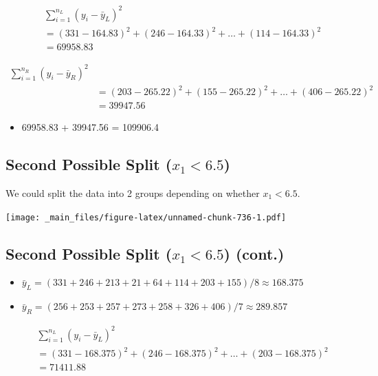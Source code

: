 \documentclass[]{book}
\providecommand{\tightlist}{%
  \setlength{\itemsep}{0pt}\setlength{\parskip}{0pt}}
\begin{document}
\[
\begin{aligned}
& \displaystyle\sum_{i=1}^{n_L} (y_i -\bar{y}_L)^2  \\
& =(331-164.83)^2+(246-164.33)^2 + \ldots+(114-164.33)^2 \\
& =69958.83
\end{aligned}
\]

\[
\begin{aligned}
\displaystyle\sum_{i=1}^{n_R} (y_i -\bar{y}_R)^2 \\
& =(203-265.22)^2+(155-265.22)^2 + \ldots+(406-265.22)^2 \\
& =39947.56
\end{aligned}
\]

\begin{itemize}
\tightlist
\item
  69958.83 + 39947.56 = 109906.4
\end{itemize}

\subsection{\texorpdfstring{Second Possible Split
(\(x_1 < 6.5\))}{Second Possible Split (x\_1 \textless{} 6.5)}}\label{second-possible-split-x_1-6.5}

We could split the data into 2 groups depending on whether
\(x_1 < 6.5\).

\texttt{[image: \_main\_files/figure-latex/unnamed-chunk-736-1.pdf]}

\subsection{\texorpdfstring{Second Possible Split (\(x_1 < 6.5\))
(cont.)}{Second Possible Split (x\_1 \textless{} 6.5) (cont.)}}\label{second-possible-split-x_1-6.5-cont.}

\begin{itemize}
\tightlist
\item
  \(\bar{y}_L = (331+246+213+21+64+114 + 203+155)/8 \approx 168.375\)\\
\item
  \(\bar{y}_R = (256+253+257+273+258+326+406)/7 \approx 289.857\)
\end{itemize}

\[
\begin{aligned}
& \displaystyle\sum_{i=1}^{n_L} (y_i -\bar{y}_L)^2  \\
& =(331-168.375)^2+(246-168.375)^2 + \ldots+(203-168.375)^2 \\
& =71411.88
\end{aligned}
\]
\end{document}
